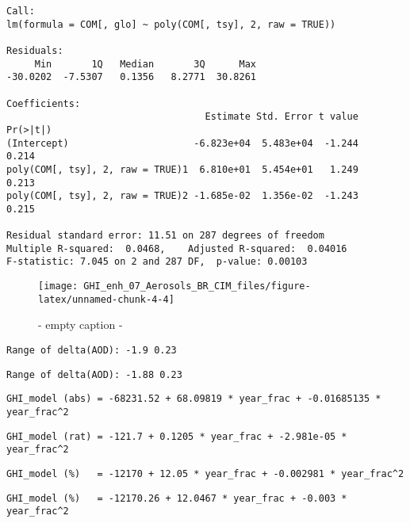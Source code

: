 \documentclass[
  10pt,
  a4paper,oneside]{article}
\begin{document}
\begin{verbatim}
Call:
lm(formula = COM[, glo] ~ poly(COM[, tsy], 2, raw = TRUE))

Residuals:
     Min       1Q   Median       3Q      Max 
-30.0202  -7.5307   0.1356   8.2771  30.8261 

Coefficients:
                                   Estimate Std. Error t value Pr(>|t|)
(Intercept)                      -6.823e+04  5.483e+04  -1.244    0.214
poly(COM[, tsy], 2, raw = TRUE)1  6.810e+01  5.454e+01   1.249    0.213
poly(COM[, tsy], 2, raw = TRUE)2 -1.685e-02  1.356e-02  -1.243    0.215

Residual standard error: 11.51 on 287 degrees of freedom
Multiple R-squared:  0.0468,    Adjusted R-squared:  0.04016 
F-statistic: 7.045 on 2 and 287 DF,  p-value: 0.00103
\end{verbatim}

\begin{figure}[H]

{\centering \texttt{[image: GHI\_enh\_07\_Aerosols\_BR\_CIM\_files/figure-latex/unnamed-chunk-4-4]} 

}

\caption{ - empty caption - }\label{fig:unnamed-chunk-4-4}
\end{figure}

\begin{verbatim}
Range of delta(AOD): -1.9 0.23 
\end{verbatim}

\begin{verbatim}
Range of delta(AOD): -1.88 0.23 
\end{verbatim}

\begin{verbatim}
GHI_model (abs) = -68231.52 + 68.09819 * year_frac + -0.01685135 * year_frac^2 
\end{verbatim}

\begin{verbatim}
GHI_model (rat) = -121.7 + 0.1205 * year_frac + -2.981e-05 * year_frac^2 
\end{verbatim}

\begin{verbatim}
GHI_model (%)   = -12170 + 12.05 * year_frac + -0.002981 * year_frac^2 
\end{verbatim}

\begin{verbatim}
GHI_model (%)   = -12170.26 + 12.0467 * year_frac + -0.003 * year_frac^2 
\end{verbatim}
\end{document}
